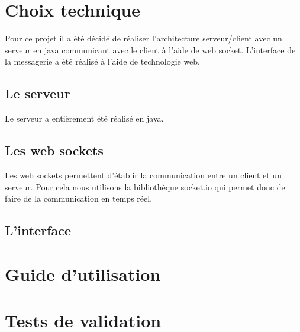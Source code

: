 \section{Choix technique}

\par Pour ce projet il a été décidé de réaliser l'architecture serveur/client avec un serveur en java communicant avec le client à l'aide de web socket. L’interface de la messagerie a été réalisé à l'aide de technologie web. 

\subsection{Le serveur}
Le serveur a entièrement été réalisé en java. 

\subsection{Les web sockets}
\par Les web sockets permettent d'établir la communication entre un client et un serveur. Pour cela nous utilisons la bibliothèque socket.io qui permet donc de faire de la communication en temps réel. 

\subsection{L'interface}


\section{Guide d'utilisation}



\section{Tests de validation}